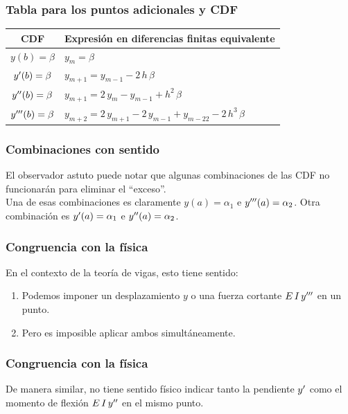 \documentclass[12pt]{beamer}
\begin{document}
\begin{frame}
\frametitle{Tabla para los puntos adicionales y CDF}
\begin{table}
\centering
\begin{tabular}{c | l}
CDF & Expresión en diferencias finitas equivalente \\ \hline
$y (b) = \beta$ & $y_{m} = \beta$ \\ \hline
${y}^{\prime} (b) = \beta$ & $y_{m+1} = y_{m-1} - 2 \, h \, \beta$ \\ \hline
${y}^{\prime \prime} (b) = \beta$ & $y_{m+1} = 2 \, y_{m} - y_{m-1} + h^{2} \, \beta$ \\ \hline
${y}^{\prime \prime \prime} (b) = \beta$ & $y_{m+2} = 2 \, y_{m+1} - 2 \, y_{m-1} + y_{m-22} - 2 \, h^{3} \, \beta$ \\ \hline
\end{tabular}
\end{table}
\end{frame}
\begin{frame}
\frametitle{Combinaciones con sentido}
El observador astuto puede notar que algunas combinaciones de las CDF no funcionarán para eliminar el \enquote{exceso}.
\\
\bigskip
\pause
Una de esas combinaciones es claramente \pause $y (a) = \alpha_{1}$ e ${y}^{\prime \prime \prime} (a) = \alpha_{2}$. \pause Otra
 combinación es ${y}^{\prime} (a) = \alpha_{1}$ e ${y}^{\prime \prime} (a) = \alpha_{2}$.
\end{frame}
\begin{frame}
\frametitle{Congruencia con la física}
En el contexto de la teoría de vigas, esto tiene sentido:
\pause
{}
\begin{enumerate}[<+->]
\item Podemos imponer un desplazamiento $y$ o una fuerza cortante $E \, I \,  {y}^{\prime \prime \prime}$ en un punto.
\item Pero es imposible aplicar ambos simultáneamente.
\end{enumerate}
\end{frame}
\begin{frame}
\frametitle{Congruencia con la física}
De manera similar, \pause no tiene sentido físico indicar tanto la pendiente ${y}^{\prime}$ como el momento de flexión $E \, I \, {y}^{\prime \prime}$ en el mismo punto.
\end{frame}
\end{document}
